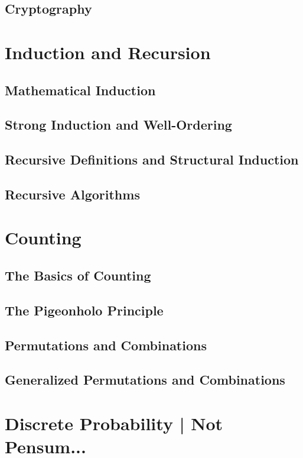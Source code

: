 \documentclass[12pt]{article}
\begin{document}
    \subsection{Cryptography}

    \section{Induction and Recursion}
    \subsection{Mathematical Induction}
    \subsection{Strong Induction and Well-Ordering}
    \subsection{Recursive Definitions and Structural Induction}
    \subsection{Recursive Algorithms}

    \section{Counting}
    \subsection{The Basics of Counting}
    \subsection{The Pigeonholo Principle}
    \subsection{Permutations and Combinations}
    \subsection{Generalized Permutations and Combinations}

    \section{Discrete Probability | Not Pensum...}
\end{document}
